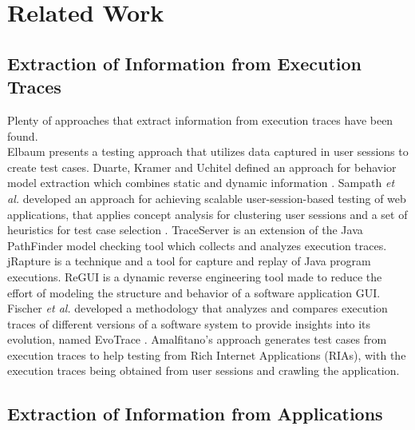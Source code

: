 \section{Related Work}

\subsection{Extraction of Information from Execution Traces} \label{sec:extractexecutiontraces}

Plenty of approaches that extract information from execution traces have been found.\\
Elbaum \cite{elbaum2003improving} presents a testing approach that utilizes data captured in user sessions to create test cases. Duarte, Kramer and Uchitel defined an approach for behavior model extraction which combines static and dynamic information \cite{duarte2006model}. Sampath \textit{et al.} developed an approach for achieving scalable user-session-based testing of web applications, that applies concept analysis for clustering user sessions and a set of heuristics for test case selection \cite{sampath2007applying}. TraceServer \cite{andjelkovic2011trace} is an extension of the Java PathFinder model checking tool \cite{jpf} which collects and analyzes execution traces.  jRapture \cite{steven2000jrapture} is a technique and a tool for capture and replay of Java program executions. ReGUI \cite{coimbra2011reverse,coimbra2012dynamic} is a dynamic reverse engineering tool made to reduce the effort of modeling the structure and behavior of a software application GUI. Fischer \textit{et al.} developed a methodology that analyzes and compares execution traces of different versions of a software system to provide insights into its evolution, named EvoTrace \cite{fischer2005system}. Amalfitano's approach \cite{amalfitano2010rich} generates test cases from execution traces to help testing from Rich Internet Applications (RIAs), with the execution traces being obtained from user sessions and crawling the application. 

\subsection{Extraction of Information from Applications}

